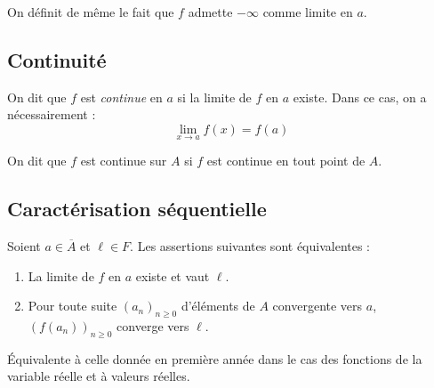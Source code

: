 \documentclass[a4paper,10pt]{report}
\begin{document}
\begin{rem} On définit de même le fait que $f$ admette $- \infty$ comme limite en $a$.
\end{rem}

\subsection{Continuité}

\begin{defip} On dit que $f$ est \textit{continue} en $a$ si la limite de $f$ en $a$ existe. Dans ce cas, on a nécessairement :
$$ \lim_{x \rightarrow a} f(x) = f(a) $$
\end{defip}

\begin{defin} On dit que $f$ est continue sur $A$ si $f$ est continue en tout point de $A$.
\end{defin}

\subsection{Caractérisation séquentielle}

\begin{prop} Soient $a \in \overline{A}$ et $\ell \in F$. Les assertions suivantes sont équivalentes :

\begin{enumerate}
\item La limite de $f$ en $a$ existe et vaut $\ell$.
\item Pour toute suite $(a_n)_{n \geq 0}$ d'éléments de $A$ convergente vers $a$, $(f(a_n))_{n \geq 0}$ converge vers $\ell$.
\end{enumerate}
\end{prop}

\begin{preuve} Équivalente à celle donnée en première année dans le cas des fonctions de la variable réelle et à valeurs réelles.
\end{preuve}
\end{document}
